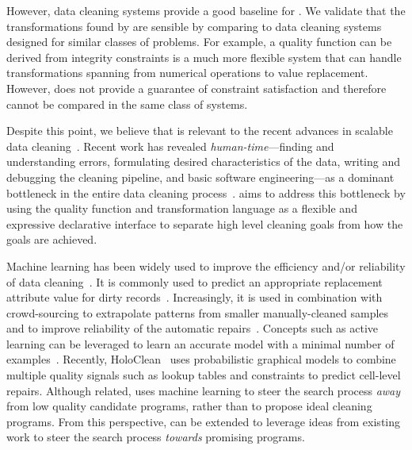 However, data cleaning systems provide a good baseline for \sys. We validate that the transformations found by \sys are sensible by comparing to data cleaning systems designed for similar classes of problems. 
For example, a quality function can be derived from integrity constraints
\sys is a much more flexible system that can handle transformations spanning from numerical operations to value replacement.
However, \sys does not provide a guarantee of constraint satisfaction and therefore cannot be compared in the same class of systems.

Despite this point, we believe that \sys is relevant to the recent advances in scalable data cleaning~\cite{wang1999sample, DBLP:journals/debu/KrishnanWFGKM015, khayyat2015bigdansing, altowim2014progressive}. Recent work has revealed {\it human-time}---finding and understanding errors, formulating desired characteristics of the data, writing and debugging the cleaning pipeline, and basic software engineering---as a dominant bottleneck in the entire data cleaning process~\cite{krishnan2016hilda}.  
\sys aims to address this bottleneck by using the quality function and transformation language as a flexible and expressive declarative interface to separate high level cleaning goals from how the goals are achieved.   

Machine learning has been widely used to improve the efficiency and/or reliability of data cleaning~\cite{DBLP:journals/pvldb/YakoutENOI11,yakout2013don,gokhale2014corleone}.
It is commonly used to predict an appropriate replacement attribute value for dirty records~\cite{yakout2013don}.
Increasingly, it is used in combination with crowd-sourcing to extrapolate patterns from smaller manually-cleaned samples~\cite{gokhale2014corleone,DBLP:journals/pvldb/YakoutENOI11} and to improve reliability of the automatic repairs~\cite{DBLP:journals/pvldb/YakoutENOI11}.
Concepts such as active learning can be leveraged to learn an accurate model with a minimal number of examples~\cite{DBLP:journals/pvldb/MozafariSFJM14}.
Recently, HoloClean~\cite{rekatsinas2017holoclean} uses probabilistic graphical models to combine multiple quality signals such as lookup tables and constraints to predict cell-level repairs.
Although related, \sys uses machine learning to steer the search process {\it away} from low quality candidate programs, rather than to propose ideal cleaning programs.  From this perspective, \sys can be extended to leverage ideas from existing work to steer the search process {\it towards} promising programs.  

